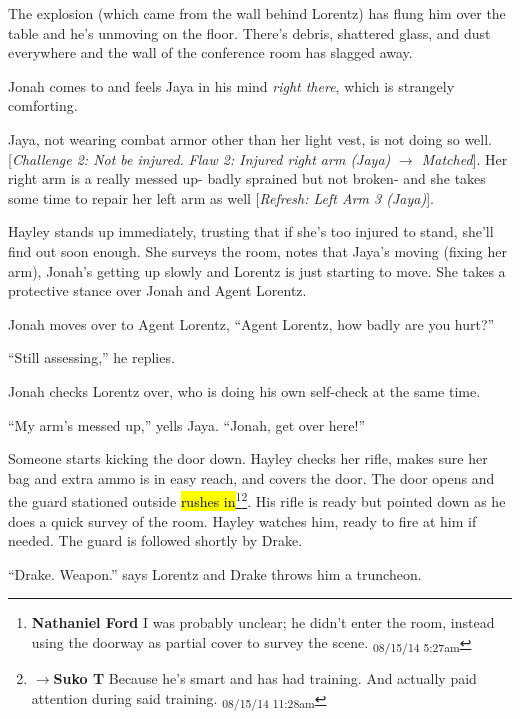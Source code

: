 The explosion (which came from the wall behind Lorentz) has flung him over the table and he's unmoving on the floor.  There's debris, shattered glass, and dust everywhere and the wall of the conference room has slagged away.  



Jonah comes to and feels Jaya in his mind \textit{right there}, which is strangely comforting.



Jaya, not wearing combat armor other than her light vest, is not doing so well. {[}\textit{Challenge 2: Not be injured.  }\textit{Flaw 2: Injured right arm (Jaya)}\textit{ $\rightarrow$ Matched}{]}.  Her right arm is a really messed up- badly sprained but not broken- and she takes some time to repair her left arm as well {[}\textit{Refresh: Left Arm 3 (Jaya)}{]}.



Hayley stands up immediately, trusting that if she's too injured to stand, she'll find out soon enough.  She surveys the room, notes that Jaya's moving (fixing her arm), Jonah's getting up slowly and Lorentz is just starting to move.  She takes a protective stance over Jonah and Agent Lorentz.



Jonah moves over to Agent Lorentz, ``Agent Lorentz, how badly are you hurt?''

``Still assessing,'' he replies.

Jonah checks Lorentz over, who is doing his own self-check at the same time.

``My arm's messed up,'' yells Jaya. ``Jonah, get over here!'' 



Someone starts kicking the door down.  Hayley checks her rifle, makes sure her bag and extra ammo is in easy reach, and covers the door.  The door opens and the guard stationed outside \hl{rushes in}\footnote{\textbf{Nathaniel Ford }I was probably unclear; he didn't enter the room, instead using the doorway as partial cover to survey the scene. \textsubscript{08/15/14 5:27am}}\footnote{$\rightarrow$\textbf{Suko T }Because he's smart and has had training.  And actually paid attention during said training. \textsubscript{08/15/14 11:28am}}.  His rifle is ready but pointed down as he does a quick survey of the room.  Hayley watches him, ready to fire at him if needed.  The guard is followed shortly by Drake.  

``Drake.  Weapon.'' says Lorentz and Drake throws him a truncheon.

